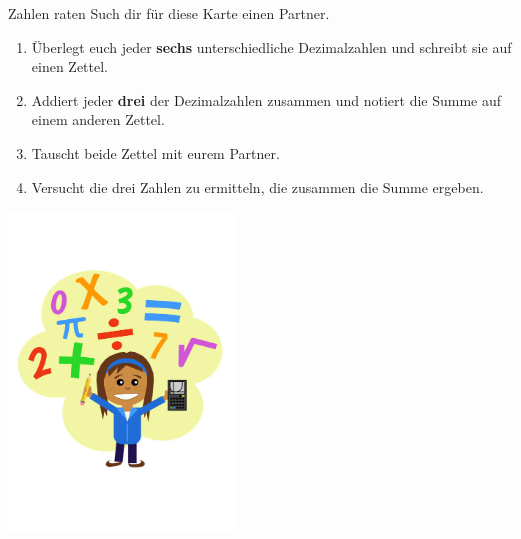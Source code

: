 \documentclass[12pt,a5paper,landscape]{scrartcl}
\begin{document}
	\begin{karte3}[\symPartner]{Zahlen raten}
		Such dir für diese Karte einen Partner.

		\begin{multicols}{2}
			\begin{enumerate}
				\item Überlegt euch jeder \textbf{sechs} unterschiedliche Dezimalzahlen und schreibt sie auf einen Zettel.
				\item Addiert jeder \textbf{drei} der Dezimalzahlen zusammen und notiert die Summe auf einem anderen Zettel.
				\item Tauscht beide Zettel mit eurem Partner.
				\item Versucht die drei Zahlen zu ermitteln, die zusammen die Summe ergeben.
			\end{enumerate}

			\columnbreak

			\begin{center}
				\includegraphics[width=6cm]{6.2-LT-Abb_Rechnen}
			\end{center}
		\end{multicols}

	\end{karte3}

	\leereKarte
\end{document}
